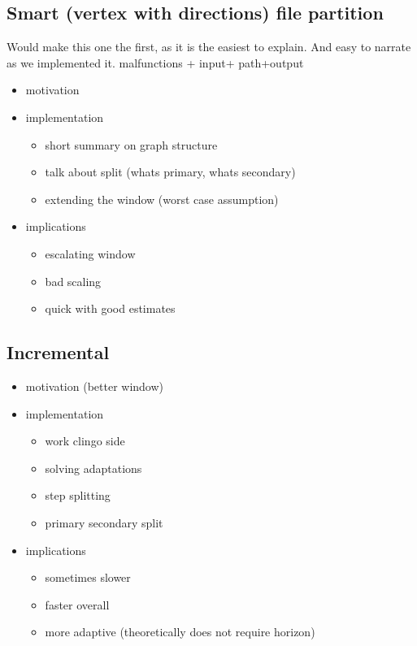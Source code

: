 \subsection{Smart (vertex with directions) file partition}
\color{green} Would make this one the first, as it is the easiest to explain. And easy to narrate as we implemented it. \color{black}
malfunctions + input+ path+output
\color{blue}
\begin{itemize}
	\item motivation
	\item implementation
	\begin{itemize}
		\item short summary on graph structure
		\item talk about split (whats primary, whats secondary)
		\item extending the window (worst case assumption)
	\end{itemize}
	\item implications
	\begin{itemize}
		\item escalating window
		\item bad scaling
		\item quick with good estimates
	\end{itemize}
\end{itemize}
\color{black}

\subsection{Incremental}
\color{blue}
\begin{itemize}
	\item motivation (better window)
	\item implementation
	\begin{itemize}
		\item work clingo side
		\item solving adaptations
		\item step splitting
		\item primary secondary split
	\end{itemize}
	\item implications
	\begin{itemize}
		\item sometimes slower
		\item faster overall
		\item more adaptive (theoretically does not require horizon)
	\end{itemize}
\end{itemize}
\color{black}

